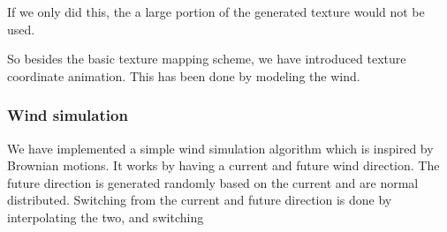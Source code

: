 If we only did this, the a large portion of the generated texture
would not be used.

So besides the basic texture mapping scheme, we have introduced
texture coordinate animation. This has been done by modeling the wind.

\subsubsection{Wind simulation}
We have implemented a simple wind simulation algorithm which is
inspired by Brownian motions. It works by having a current and future
wind direction. The future direction is generated randomly based on
the current and are normal distributed. Switching from the current and
future direction is done by interpolating the two, and switching 







